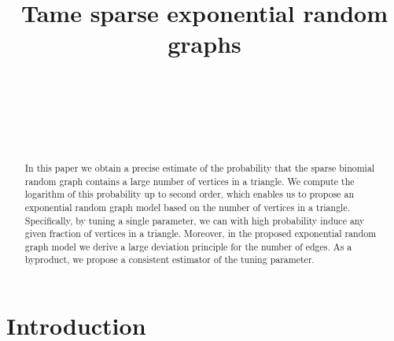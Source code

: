 \documentclass[bj,authoryear,noshowframe]{imsart}
\numberwithin{equation}{section}
\theoremstyle{plain}
\theoremstyle{definition}
\begin{document}
\begin{frontmatter}

\title{Tame sparse exponential random graphs}


\begin{aug}

\author[A]{~}
\author[B]{~}
\author[C]{~}

\address[A]{Pijnacker, Netherlands}
\address[B]{Department of Mathematics and Computer Science, Eindhoven University of Technology, Eindhoven, Netherlands}
\address[C]{Mathematical Institute, Leiden University, Leiden, Netherlands}

\end{aug}


\begin{abstract}
In this paper we obtain a precise estimate of the probability that the sparse binomial random graph contains a large number of vertices in a triangle. We compute the logarithm of this probability up to second order, which enables us to propose an exponential random graph model based on the number of vertices in a triangle. Specifically, by tuning a single parameter, we can with high probability induce any given fraction of vertices in a triangle. Moreover, in the proposed exponential random graph model we derive a large deviation principle for the number of edges. As a byproduct, we propose a consistent estimator of the tuning parameter.
\end{abstract}

\begin{keyword}
\end{keyword}

\end{frontmatter}



\section{Introduction}
\end{document}
